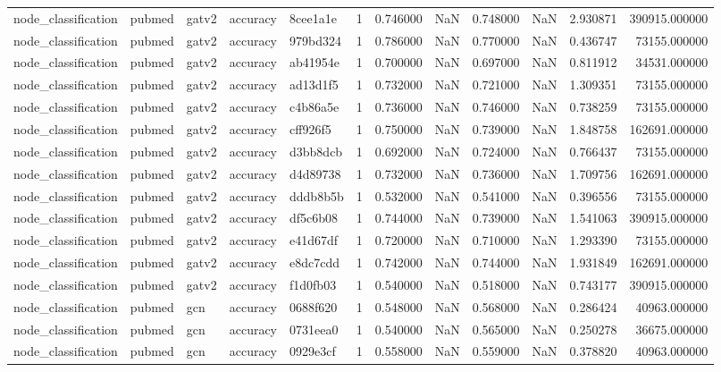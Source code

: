 \begin{tabular}{lllllrrrrrrr}
node_classification & pubmed & gatv2 & accuracy & 8cee1a1e & 1 & 0.746000 & NaN & 0.748000 & NaN & 2.930871 & 390915.000000 \\
node_classification & pubmed & gatv2 & accuracy & 979bd324 & 1 & 0.786000 & NaN & 0.770000 & NaN & 0.436747 & 73155.000000 \\
node_classification & pubmed & gatv2 & accuracy & ab41954e & 1 & 0.700000 & NaN & 0.697000 & NaN & 0.811912 & 34531.000000 \\
node_classification & pubmed & gatv2 & accuracy & ad13d1f5 & 1 & 0.732000 & NaN & 0.721000 & NaN & 1.309351 & 73155.000000 \\
node_classification & pubmed & gatv2 & accuracy & c4b86a5e & 1 & 0.736000 & NaN & 0.746000 & NaN & 0.738259 & 73155.000000 \\
node_classification & pubmed & gatv2 & accuracy & cff926f5 & 1 & 0.750000 & NaN & 0.739000 & NaN & 1.848758 & 162691.000000 \\
node_classification & pubmed & gatv2 & accuracy & d3bb8dcb & 1 & 0.692000 & NaN & 0.724000 & NaN & 0.766437 & 73155.000000 \\
node_classification & pubmed & gatv2 & accuracy & d4d89738 & 1 & 0.732000 & NaN & 0.736000 & NaN & 1.709756 & 162691.000000 \\
node_classification & pubmed & gatv2 & accuracy & dddb8b5b & 1 & 0.532000 & NaN & 0.541000 & NaN & 0.396556 & 73155.000000 \\
node_classification & pubmed & gatv2 & accuracy & df5c6b08 & 1 & 0.744000 & NaN & 0.739000 & NaN & 1.541063 & 390915.000000 \\
node_classification & pubmed & gatv2 & accuracy & e41d67df & 1 & 0.720000 & NaN & 0.710000 & NaN & 1.293390 & 73155.000000 \\
node_classification & pubmed & gatv2 & accuracy & e8dc7cdd & 1 & 0.742000 & NaN & 0.744000 & NaN & 1.931849 & 162691.000000 \\
node_classification & pubmed & gatv2 & accuracy & f1d0fb03 & 1 & 0.540000 & NaN & 0.518000 & NaN & 0.743177 & 390915.000000 \\
node_classification & pubmed & gcn & accuracy & 0688f620 & 1 & 0.548000 & NaN & 0.568000 & NaN & 0.286424 & 40963.000000 \\
node_classification & pubmed & gcn & accuracy & 0731eea0 & 1 & 0.540000 & NaN & 0.565000 & NaN & 0.250278 & 36675.000000 \\
node_classification & pubmed & gcn & accuracy & 0929e3cf & 1 & 0.558000 & NaN & 0.559000 & NaN & 0.378820 & 40963.000000 \\

\end{tabular}
